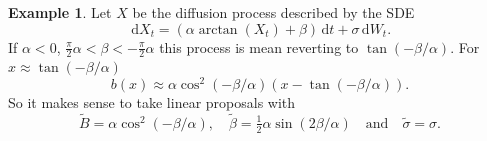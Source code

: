 \documentclass[preprint]{imsart}
\renewcommand{\tilde}{\widetilde}
\theoremstyle{definition}
\newtheorem{ex}[thm]{Example}
\newcommand{\dd}{{\,\mathrm d}}
\begin{document}
\begin{ex}\label{ex:arctan}
Let $X$ be the  diffusion process described by the SDE
\begin{equation}\label{eq:sde-arctan}
\dd X_t = (\alpha \arctan(X_t) + \beta) \dd t + \sigma \dd W_t.
\end{equation}
If $\alpha< 0$, $\tfrac{\pi}{2}\alpha < \beta< -\tfrac\pi2 \alpha $ this process is mean reverting to $\tan(-\beta/\alpha)$. For $x\approx \tan(-\beta/\alpha)$
\[b(x) \approx \alpha \cos^2(-\beta/\alpha) (x -\tan(-\beta/\alpha)).\]
So it makes sense to take linear proposals with 
\[\tilde{B}=\alpha \cos^2(-\beta/\alpha),\quad \tilde{\beta}= \tfrac12 \alpha \sin(2 \beta/\alpha)\quad \text{and} \quad \tilde\sigma=\sigma.\]
\end{ex}

\end{document}

